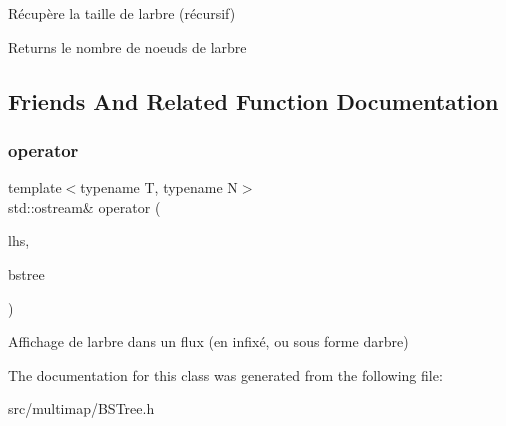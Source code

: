 Récupère la taille de l\textquotesingle{}arbre (récursif)

\begin{DoxyReturn}{Returns}
le nombre de noeuds de l\textquotesingle{}arbre 
\end{DoxyReturn}


\subsection{Friends And Related Function Documentation}
\mbox{\label{classBSTree_a1e8a7cc184833a959c0e8139756c22a7}} 
\subsubsection{\texorpdfstring{operator}{operator}}
{\footnotesize\ttfamily template$<$typename T, typename N$>$ \\
std\+::ostream\& operator (\begin{DoxyParamCaption}\item[{std\+::ostream \&}]{lhs,  }\item[{const \hyperlink{classBSTree}{B\+S\+Tree}$<$ T, \hyperlink{classBSTree_a9c1a06548b3ff425e1d906f17ce2c858}{Node} $>$ \&}]{bstree }\end{DoxyParamCaption})\hspace{0.3cm}{\ttfamily [friend]}}

Affichage de l\textquotesingle{}arbre dans un flux (en infixé, ou sous forme d\textquotesingle{}arbre) 

The documentation for this class was generated from the following file\+:\begin{DoxyCompactItemize}
\item 
src/multimap/B\+S\+Tree.\+h\end{DoxyCompactItemize}

